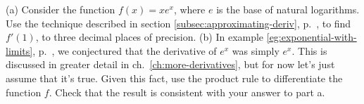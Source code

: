 (a) Consider the function $f(x)=xe^x$, where $e$ is the base of natural logarithms.
Use the technique described in section \ref{subsec:approximating-deriv}, p.~\pageref{subsec:approximating-deriv}, to find
$f'(1)$, to three decimal places of precision.\answercheck\hwendpart
(b) In example \ref{eg:exponential-with-limits}, p.~\pageref{eg:exponential-with-limits},
we conjectured that the derivative of $e^x$ was simply $e^x$. This is discussed in
greater detail in ch.~\ref{ch:more-derivatives}, but for now let's just assume that
it's true. Given this fact, use the product rule to differentiate the function $f$.
Check that the result is consistent with your answer to part a.\answercheck\hwendpart
